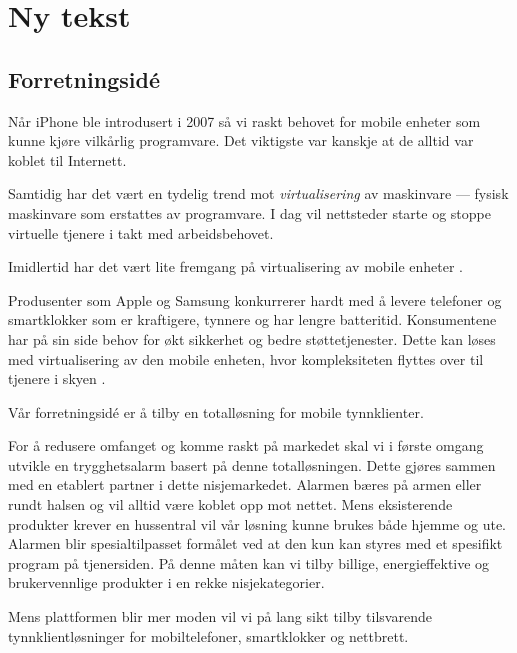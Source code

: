 \chapter{Ny tekst}

\section{Forretningsidé}

Når iPhone ble introdusert i 2007 så vi raskt behovet for mobile enheter som
kunne kjøre vilkårlig programvare. Det viktigste var kanskje at de alltid var
koblet til Internett.

Samtidig har det vært en tydelig trend mot \textit{virtualisering} av
maskinvare \cite{2006.virtualization.trends} --- fysisk maskinvare som
erstattes av programvare.  I dag vil nettsteder starte og stoppe virtuelle
tjenere i takt med arbeidsbehovet.

Imidlertid har det vært lite fremgang på virtualisering av mobile enheter
\cite{embedded.virtualization}.

Produsenter som Apple og Samsung konkurrerer hardt med å levere telefoner og
smartklokker som er kraftigere, tynnere og har lengre batteritid.
%
Konsumentene har på sin side behov for økt sikkerhet og bedre støttetjenester.
%
Dette kan løses med virtualisering av den mobile enheten, hvor kompleksiteten
flyttes over til tjenere i skyen \cite{mobil.virt.fordel}.

Vår forretningsidé er å tilby en totalløsning for mobile tynnklienter.

For å redusere omfanget og komme raskt på markedet skal vi i første omgang
utvikle en trygghetsalarm basert på denne totalløsningen.
%
Dette gjøres sammen med en etablert partner i dette nisjemarkedet.
%
Alarmen bæres på armen eller rundt halsen og vil alltid være koblet opp mot
nettet.
%
Mens eksisterende produkter krever en hussentral vil vår løsning kunne brukes
både hjemme og ute.
%
Alarmen blir spesialtilpasset formålet ved at den kun kan styres med et
spesifikt program på tjenersiden.
%
På denne måten kan vi tilby billige, energieffektive og brukervennlige
produkter i en rekke nisjekategorier.

Mens plattformen blir mer moden vil vi på lang sikt tilby tilsvarende
tynnklientløsninger for mobiltelefoner, smartklokker og nettbrett.
